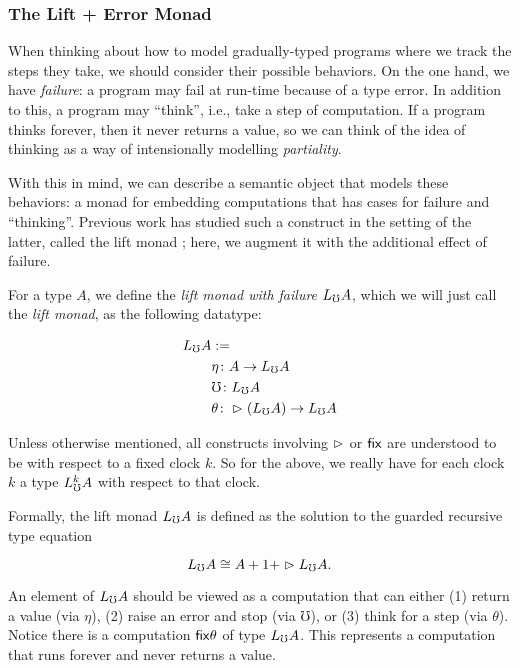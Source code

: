 \subsubsection{The Lift + Error Monad}

When thinking about how to model gradually-typed programs where we track the steps they take,
we should consider their possible behaviors. On the one hand, we have \emph{failure}: a program may fail
at run-time because of a type error. In addition to this, a program may ``think'',
i.e., take a step of computation. If a program thinks forever, then it never returns a value,
so we can think of the idea of thinking as a way of intensionally modelling \emph{partiality}.

With this in mind, we can describe a semantic object that models these behaviors: a monad
for embedding computations that has cases for failure and ``thinking''.
Previous work has studied such a construct in the setting of the latter, called the lift
monad \cite{mogelberg-paviotti2016}; here, we augment it with the additional effect of failure.

For a type $A$, we define the \emph{lift monad with failure} $L_\mho A$, which we will just call
the \emph{lift monad}, as the following datatype:

\begin{align*}
  L_\mho A &:= \\
  &\eta \colon A \to L_\mho A \\
  &\mho \colon L_\mho A \\
  &\theta \colon \vartriangleright (L_\mho A) \to L_\mho A
\end{align*}

Unless otherwise mentioned, all constructs involving $\vartriangleright$ or $\mathsf{fix}$
are understood to be with respect to a fixed clock $k$. So for the above, we really have for each
clock $k$ a type $L_\mho^k A$ with respect to that clock.

Formally, the lift monad $L_\mho A$ is defined as the solution to the guarded recursive type equation

\[ L_\mho A \cong A + 1 + \vartriangleright L_\mho A. \]

An element of $L_\mho A$ should be viewed as a computation that can either (1) return a value (via $\eta$),
(2) raise an error and stop (via $\mho$), or (3) think for a step (via $\theta$).
%
Notice there is a computation $\mathsf{fix} \theta$ of type $L_\mho A$. This represents a computation
that runs forever and never returns a value.

